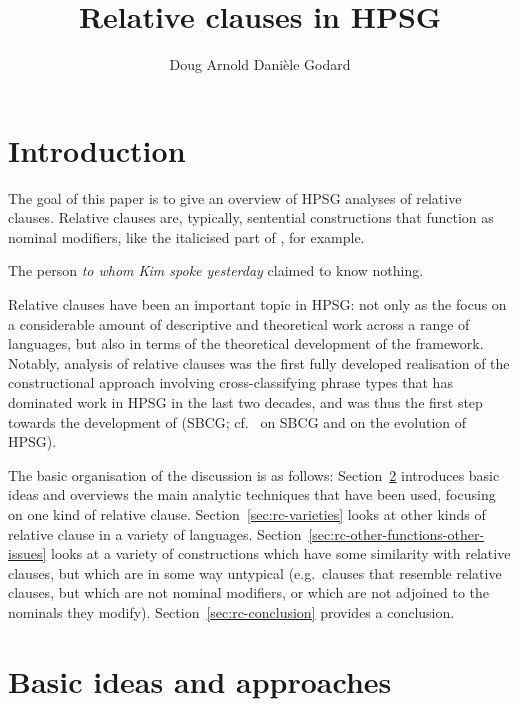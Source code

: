 \documentclass[output=paper
 	        ,biblatex
                ,babelshorthands
                ,newtxmath
                ,draftmode
                ,colorlinks, citecolor=brown
]{langscibook}
\title{Relative clauses in HPSG}
\author{%
 Doug Arnold\affiliation{University of Essex}\lastand 
 Danièle Godard\affiliation{Université de Paris}
}
\begin{document}
\maketitle
\label{chap-relative-clauses}

\section{Introduction}
\label{sec:rc-introduction}

The goal of this paper is to give an overview of HPSG analyses of
relative clauses. Relative clauses are, typically, sentential constructions that function as nominal
modifiers, like the italicised part of , for example.
\begin{exe}\ex
    \label{x:rc-1} The person \emph{to whom Kim spoke yesterday} claimed to know nothing.
\end{exe}
Relative clauses have been an important topic in HPSG: not only as the focus on a
considerable amount of descriptive and theoretical work across a range of languages, but
also in terms of the theoretical development of the framework. Notably, 
analysis of  relative clauses was the first fully developed realisation of the
constructional approach involving cross-classifying phrase types that has dominated work
in HPSG in the last two decades, and was thus the first step towards the development of
 (SBCG; cf.\ 
on SBCG and  on the evolution of HPSG).

The basic organisation of the discussion is as follows: Section~\ref{sec:rc-approaches}
introduces basic ideas and overviews the main analytic techniques that have been used, focusing
on one kind of relative clause. Section~\ref{sec:rc-varieties} looks at other kinds of
relative clause in a variety of languages. Section~\ref{sec:rc-other-functions-other-issues}
looks at a variety of constructions which have some similarity with relative clauses, but which are in
some way untypical (e.g.\ clauses that resemble relative clauses, but which are not
nominal modifiers, or which are not adjoined to the nominals they
modify). Section~\ref{sec:rc-conclusion} provides a conclusion.

\section{Basic ideas and approaches}
\label{sec:rc-approaches}
\end{document}
